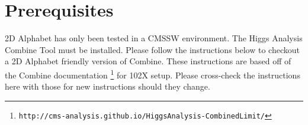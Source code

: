 \documentclass[letter]{article}
\begin{document}
\section{Prerequisites}


    2D Alphabet has only been tested in a CMSSW environment. The Higgs Analysis Combine Tool must be installed. Please follow the instructions below to checkout a 2D Alphabet friendly version of Combine. These instructions are based off of the Combine documentation \footnote{\verb"http://cms-analysis.github.io/HiggsAnalysis-CombinedLimit/"} for 102X setup. Please cross-check the instructions here with those for new instructions should they change.
\end{document}
